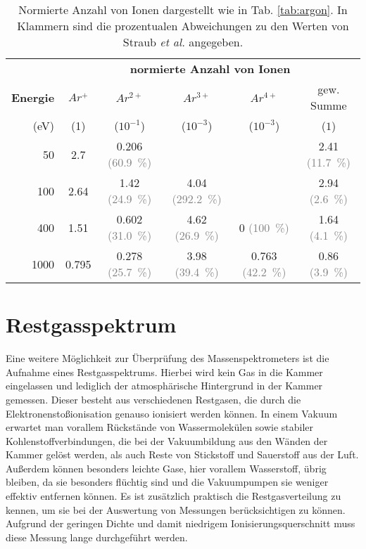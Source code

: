 \begin{table}
    \centering
    \caption[Normierte Anzahl von Ionen und Abweichung zu Werten von Straub \textit{et al.}]{Normierte Anzahl von Ionen dargestellt wie in Tab. \ref{tab:argon}. In Klammern sind die prozentualen Abweichungen zu den Werten von Straub \textit{et al.} \cite{Straub} angegeben.}
    \label{tab:vergleich}
    \begin{tabular}{r c c c c c}
        \toprule
        \text{} & \multicolumn{5}{c}{\textbf{normierte Anzahl von Ionen}} \\ 

        \textbf{Energie} & $Ar^+$ & $Ar^{2+}$ & $Ar^{3+}$ & $Ar^{4+}$ & gew. Summe \\
        (eV) & (1) & ($10^{-1}$) & ($10^{-3}$) & ($10^{-3}$) & ($1$) \\
        \midrule
        50  & {2.7}  & {0.206} \textcolor{gray}{(60.9\ \%)} & {}  & {}  & {2.41} \textcolor{gray}{(11.7\ \%)}   \\
        100 & 2.64  & 1.42 \textcolor{gray}{(24.9\ \%)} & 4.04 \textcolor{gray}{(292.2\ \%)} & {} & 2.94 \textcolor{gray}{(2.6\ \%)} \\
        400 & 1.51  & 0.602 \textcolor{gray}{(31.0\ \%)} & 4.62 \textcolor{gray}{(26.9\ \%)} & 0 \textcolor{gray}{(100\ \%)} & 1.64 \textcolor{gray}{(4.1\ \%)} \\
        1000 & 0.795  & 0.278 \textcolor{gray}{(25.7\ \%)} & 3.98 \textcolor{gray}{(39.4\ \%)} & 0.763 \textcolor{gray}{(42.2\ \%)} & 0.86 \textcolor{gray}{(3.9\ \%)} \\
               
        
        \bottomrule
    \end{tabular}
\end{table}

\section{Restgasspektrum}
Eine weitere Möglichkeit zur Überprüfung des Massenspektrometers ist die Aufnahme eines Restgasspektrums. Hierbei wird kein Gas in die Kammer eingelassen und lediglich der atmosphärische Hintergrund in der Kammer gemessen. Dieser besteht aus verschiedenen Restgasen, die durch die Elektronenstoßionisation genauso ionisiert werden können. In einem Vakuum erwartet man vorallem Rückstände von Wassermolekülen sowie stabiler Kohlenstoffverbindungen, die bei der Vakuumbildung aus den Wänden der Kammer gelöst werden, als auch Reste von Stickstoff und Sauerstoff aus der Luft. Außerdem können besonders leichte Gase, hier vorallem Wasserstoff, übrig bleiben, da sie besonders flüchtig sind und die Vakuumpumpen sie weniger effektiv entfernen können. Es ist zusätzlich praktisch die Restgasverteilung zu kennen, um sie bei der Auswertung von Messungen berücksichtigen zu können. Aufgrund der geringen Dichte und damit niedrigem Ionisierungsquerschnitt muss diese Messung lange durchgeführt werden. 


